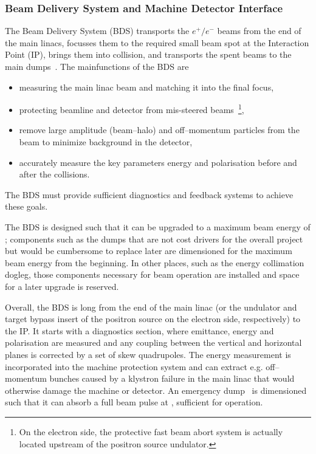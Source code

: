 \subsubsection{Beam Delivery System and Machine Detector Interface}

The Beam Delivery System (BDS) transports the $e^+/e^-$ beams from the end of the main linacs, focusses them to the required small beam spot at the Interaction Point (IP), brings them into collision, and transports the spent beams to the main dumps~\cite[Chap. 8]{Adolphsen:2013kya}.
The mainfunctions of the BDS are
\begin{itemize}
\item measuring the main linac beam and matching it into the final focus,
\item protecting beamline and detector from mis-steered beams~\footnote{On the electron side, the protective fast beam abort system is actually located upstream of the positron source undulator.},
\item remove large amplitude (beam--halo) and off--momentum particles from the beam to minimize background in the detector,
\item accurately measure the key parameters energy and polarisation before and after the collisions.
\end{itemize}
The BDS must provide sufficient diagnostics and feedback systems to achieve these goals.

The BDS is designed such that it can be upgraded to a maximum beam energy of ; components such as the dumps that are not cost drivers for the overall project but would be cumbersome to replace later are dimensioned for the maximum beam energy from the beginning.
In other places, such as the energy collimation dogleg, those components necessary for  beam operation are installed and space for a later upgrade is reserved.

Overall, the BDS is  long from the end of the main linac (or the undulator and target bypass insert of the positron source on the electron side, respectively) to the IP.
It starts with a diagnostics section, where emittance, energy and polarisation are measured and any coupling between the vertical and horizontal planes is corrected by a set of skew quadrupoles.
The energy measurement is incorporated into the machine protection system and can extract e.g. off--momentum bunches caused by a klystron failure in the main linac that would otherwise damage the machine or detector.
An emergency dump~\cite{bib:cr-0013} is dimensioned such that it can absorb a full beam pulse at , sufficient for  operation.

